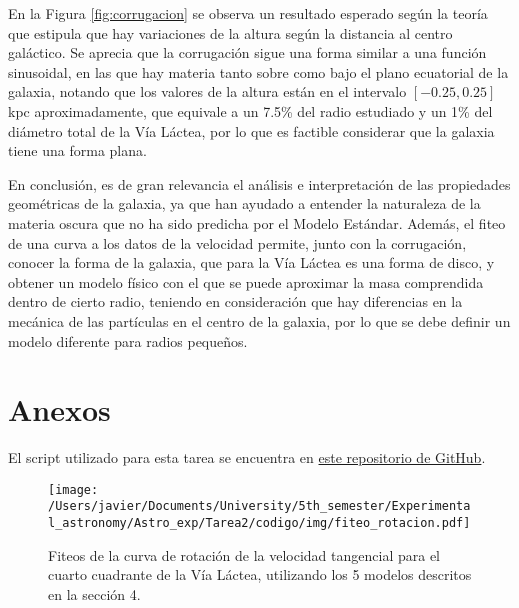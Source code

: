 \documentclass[letterpaper,oneside]{article}
\begin{document}

En la Figura \ref{fig:corrugacion} se observa un resultado esperado según la teoría que estipula que hay variaciones de la altura según la distancia al centro galáctico. Se aprecia que la corrugación sigue una forma similar a una función sinusoidal, en las que hay materia tanto sobre como bajo el plano ecuatorial de la galaxia, notando que los valores de la altura están en el intervalo $[-0.25,0.25]$ kpc aproximadamente, que equivale a un 7.5\% del radio estudiado y un 1\% del diámetro total de la Vía Láctea, por lo que es factible considerar que la galaxia tiene una forma plana.

En conclusión, es de gran relevancia el análisis e interpretación de las propiedades geométricas de la galaxia, ya que han ayudado a entender la naturaleza de la materia oscura que no ha sido predicha por el Modelo Estándar. Además, el fiteo de una curva a los datos de la velocidad permite, junto con la corrugación, conocer la forma de la galaxia, que para la Vía Láctea es una forma de disco, y obtener un modelo físico con el que se puede aproximar la masa comprendida dentro de cierto radio, teniendo en consideración que hay diferencias en la mecánica de las partículas en el centro de la galaxia, por lo que se debe definir un modelo diferente para radios pequeños.

\newpage
\section{Anexos}
El script utilizado para esta tarea se encuentra en \href{https://github.com/Wenupi/Astro_exp}{este repositorio de GitHub}.







\begin{figure}[H]
    \centering
    \texttt{[image: /Users/javier/Documents/University/5th\_semester/Experimental\_astronomy/Astro\_exp/Tarea2/codigo/img/fiteo\_rotacion.pdf]}
    \caption{Fiteos de la curva de rotación de la velocidad tangencial para el cuarto cuadrante de la Vía Láctea, utilizando los 5 modelos descritos en la sección 4.}
    \label{fig:fit-curva-rotacion}
\end{figure}



\end{document}
